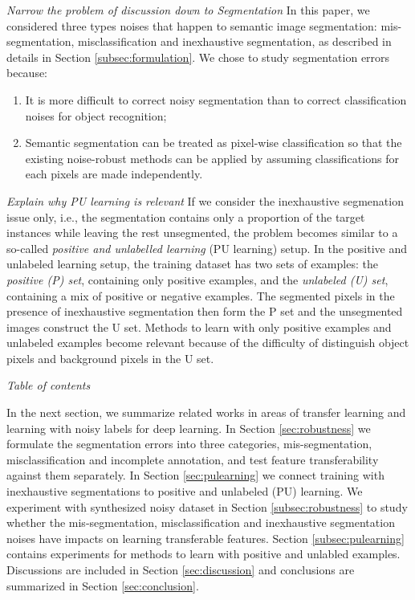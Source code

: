 \noindent \textit{Narrow the problem of discussion down to Segmentation}
\noindent
In this paper, we considered three types noises that happen to semantic image segmentation: mis-segmentation, misclassification and inexhaustive segmentation, as described in details in Section \ref{subsec:formulation}.
We chose to study segmentation errors because:
\begin{enumerate}
  \item It is more difficult to correct noisy segmentation than to correct classification noises for object recognition;
  \item Semantic segmentation can be treated as pixel-wise classification so that the existing noise-robust methods can be applied by assuming classifications for each pixels are made independently.
\end{enumerate}


\noindent \textit{Explain why PU learning is relevant}
\noindent
If we consider the inexhaustive segmenation issue only, i.e., the segmentation contains only a proportion of the target instances while leaving the rest unsegmented, the problem becomes similar to a so-called \textit{positive and unlabelled learning} (PU learning) setup\cite{li2005learning}.
In the positive and unlabeled learning setup, the training dataset has two sets of examples: the \textit{positive (P) set}, containing only positive examples, and the \textit{unlabeled (U) set}, containing a mix of positive or negative examples.
The segmented pixels in the presence of inexhaustive segmentation then form the P set and the unsegmented images construct the U set.
Methods to learn with only positive examples and unlabeled examples become relevant because of the difficulty of distinguish object pixels and background pixels in the U set.


\noindent \textit{Table of contents}

\noindent
In the next section, we summarize related works in areas of transfer learning and learning with noisy labels for deep learning.
In Section \ref{sec:robustness} we formulate the segmentation errors into three categories, mis-segmentation, misclassification and incomplete annotation, and test feature transferability against them separately.
In Section \ref{sec:pulearning} we connect training with inexhaustive segmentations to positive and unlabeled (PU) learning.
We experiment with synthesized noisy dataset in Section \ref{subsec:robustness} to study whether the mis-segmentation, misclassification and inexhaustive segmentation noises have impacts on learning transferable features.
Section \ref{subsec:pulearning} contains experiments for methods to learn with positive and unlabled examples.
Discussions are included in Section \ref{sec:discussion} and conclusions are summarized in Section \ref{sec:conclusion}.

